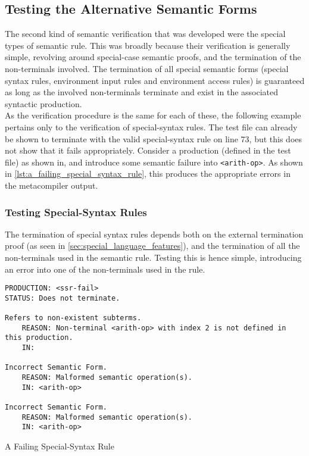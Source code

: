 
\subsection{Testing the Alternative Semantic Forms} %
\label{sub:testing_the_alternative_semantic_forms}
The second kind of semantic verification that was developed were the special types of semantic rule.
This was broadly because their verification is generally simple, revolving around special-case semantic proofs, and the termination of the non-terminals involved.
The termination of all special semantic forms (special syntax rules, environment input rules and environment access rules) is guaranteed as long as the involved non-terminals terminate and exist in the associated syntactic production. \\

As the verification procedure is the same for each of these, the following example pertains only to the verification of special-syntax rules. 
The test file can already be shown to terminate with the valid special-syntax rule on line 73, but this does not show that it fails appropriately.
Consider a production (defined in the test file) as shown in, and introduce some semantic failure into \texttt{<arith-op>}.
As shown in \autoref{lst:a_failing_special_syntax_rule}, this produces the appropriate errors in the metacompiler output. 

\subsubsection{Testing Special-Syntax Rules} %
\label{ssub:testing_special_syntax_rules}
The termination of special syntax rules depends both on the external termination proof (as seen in \autoref{sec:special_language_features}), and the termination of all the non-terminals used in the semantic rule. 
Testing this is hence simple, introducing an error into one of the non-terminals used in the rule.

\begin{listing}[!htb]
\begin{verbatim}
PRODUCTION: <ssr-fail>
STATUS: Does not terminate.

Refers to non-existent subterms.
    REASON: Non-terminal <arith-op> with index 2 is not defined in this production.
    IN:

Incorrect Semantic Form.
    REASON: Malformed semantic operation(s).
    IN: <arith-op>

Incorrect Semantic Form.
    REASON: Malformed semantic operation(s).
    IN: <arith-op>
\end{verbatim}
\caption{A Failing Special-Syntax Rule}
\label{lst:a_failing_special_syntax_rule}
\end{listing}

